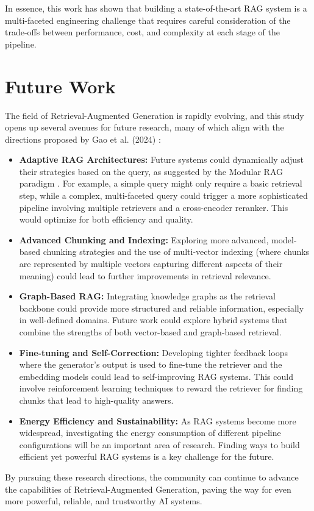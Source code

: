 In essence, this work has shown that building a state-of-the-art RAG system is a multi-faceted engineering challenge that requires careful consideration of the trade-offs between performance, cost, and complexity at each stage of the pipeline.

\section{Future Work}
The field of Retrieval-Augmented Generation is rapidly evolving, and this study opens up several avenues for future research, many of which align with the directions proposed by Gao et al. (2024) \autocite{gao2024retrievalaugmented}:
\begin{itemize}
    \item \textbf{Adaptive RAG Architectures:} Future systems could dynamically adjust their strategies based on the query, as suggested by the Modular RAG paradigm \autocite{gao2024retrievalaugmented}. For example, a simple query might only require a basic retrieval step, while a complex, multi-faceted query could trigger a more sophisticated pipeline involving multiple retrievers and a cross-encoder reranker. This would optimize for both efficiency and quality.
    \item \textbf{Advanced Chunking and Indexing:} Exploring more advanced, model-based chunking strategies and the use of multi-vector indexing (where chunks are represented by multiple vectors capturing different aspects of their meaning) could lead to further improvements in retrieval relevance.
    \item \textbf{Graph-Based RAG:} Integrating knowledge graphs as the retrieval backbone could provide more structured and reliable information, especially in well-defined domains. Future work could explore hybrid systems that combine the strengths of both vector-based and graph-based retrieval.
    \item \textbf{Fine-tuning and Self-Correction:} Developing tighter feedback loops where the generator's output is used to fine-tune the retriever and the embedding models could lead to self-improving RAG systems. This could involve reinforcement learning techniques to reward the retriever for finding chunks that lead to high-quality answers.
    \item \textbf{Energy Efficiency and Sustainability:} As RAG systems become more widespread, investigating the energy consumption of different pipeline configurations will be an important area of research. Finding ways to build efficient yet powerful RAG systems is a key challenge for the future.
\end{itemize}

By pursuing these research directions, the community can continue to advance the capabilities of Retrieval-Augmented Generation, paving the way for even more powerful, reliable, and trustworthy AI systems.